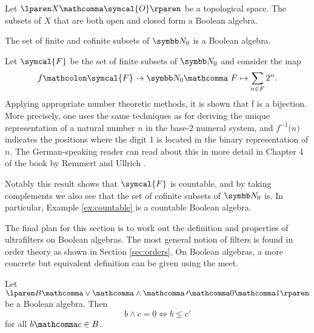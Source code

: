 \begin{example}
\label{ex:clopen}
  Let
  $\lparen X \mathcomma \symcal{O} \rparen$
  be a topological space.
  The subsets of $X$ that are both open and closed form a Boolean algebra.
\end{example}

\begin{example}
\label{ex:countable}
  The set of finite and cofinite subsets of $\N_0$ is a Boolean algebra.
\end{example}

\begin{remark}
  Let $\symcal{F}$ be the set of finite subsets of $\N_0$ and consider the map
  \[
    f \mathcolon \symcal{F} \rightarrow \N_0 \mathcomma \
    F \mapsto \sum_{n \in F} 2^n.
  \]
  Applying appropriate number theoretic methods,
  it is shown that f is a bijection.
  More precisely, one uses the same techniques as for deriving
  the unique representation of a natural number $n$
  in the base-$2$ numeral system,
  and $f^{\minus 1} \lparen n \rparen$ indicates the positions
  where the digit 1 is located in the binary representation of $n$.
  The German-speaking reader can read about this in more detail
  in Chapter 4 of the book
   by Remmert and Ullrich
  \cite{remmert:zahlentheorie-3}.

  Notably this result shows that $\symcal{F}$ is countable,
  and by taking complements we also see that
  the set of cofinite subsets of $\N_0$ is.
  In particular, Example \ref{ex:countable} is a countable Boolean algebra.
\end{remark}

\medskip

The final plan for this section is to work out
the definition and properties of ultrafilters on Boolean algebras.
The most general notion of filters is found in order theory
as shown in Section \ref{sec:orders}.
On Boolean algebras, a more concrete but equivalent definition
can be given using the meet.

\medskip

\begin{lemma}
\label{la:order_complement}
  Let
  $\lparen B \mathcomma \vee \mathcomma \wedge \mathcomma \, \prime
  \mathcomma 0 \mathcomma 1 \rparen$
  be a Boolean algebra.
  Then
  \[
    b \wedge c \equal 0
    \Leftrightarrow
    b \leq c \prime
  \]
  for all $b \mathcomma c \in B$.
\end{lemma}


